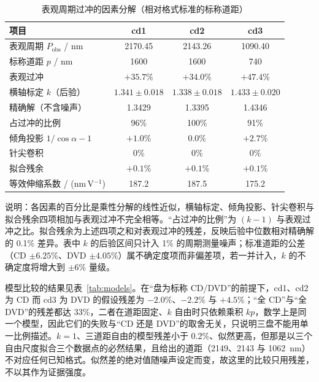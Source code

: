 \documentclass[12pt,a4paper,fontset=windows]{ctexart}
\begin{document}
\begin{table}[H]
\centering
\caption{表观周期过冲的因素分解（相对格式标准的标称道距）}
\label{tab:scale}
\footnotesize
{}
\begin{tabular}{@{}lccc@{}}
\toprule
项目 & cd1 & cd2 & cd3 \\
\midrule
表观周期 $P_{\text{obs}}$ / nm & 2170.45 & 2143.26 & 1090.40 \\
标称道距 $p$ / nm & 1600 & 1600 & 740 \\
表观过冲 & $+35.7\%$ & $+34.0\%$ & $+47.4\%$ \\
\midrule
横轴标定 $k$（后验）& $1.341\pm0.018$ & $1.338\pm0.018$ & $1.433\pm0.020$ \\
\quad 精确解（不含噪声）& 1.3429 & 1.3395 & 1.4346 \\
\quad 占过冲的比例 & 96\% & 100\% & 91\% \\
倾角投影 $1/\cos\alpha-1$ & $+1.0\%$ & $0.0\%$ & $+2.7\%$ \\
针尖卷积 & $0\%$ & $0\%$ & $0\%$ \\
拟合残余 & $+0.1\%$ & $+0.1\%$ & $+0.1\%$ \\
\midrule
等效伸缩系数 / (nm\,V$^{-1}$) & 187.2 & 187.5 & 175.2 \\
\bottomrule
\end{tabular}

\vspace{2pt}
\footnotesize 说明：各因素的百分比是乘性分解的线性近似，横轴标定、倾角投影、针尖卷积与拟合残余四项相加与表观过冲不完全相等。“占过冲的比例”为 $(k-1)$ 与表观过冲之比。拟合残余为上述四项之和对表观过冲的残差，反映后验中位数相对精确解的 0.1\% 差异。表中 $k$ 的后验区间只计入 1\% 的周期测量噪声；标准道距的公差（CD $\pm6.25\%$、DVD $\pm4.05\%$）属不确定度项而非偏差项，若一并计入，$k$ 的不确定度将增大到 $\pm6\%$ 量级。
\end{table}

模型比较的结果见表~\ref{tab:models}。在“盘为标称 CD/DVD”的前提下，cd1、cd2 为 CD 而 cd3 为 DVD 的假设残差为 $-2.0\%$、$-2.2\%$ 与 $+4.5\%$；“全 CD”与“全 DVD”的残差都达 33\%，二者在道距固定、$k$ 自由时只依赖乘积 $kp$，数学上是同一个模型，因此它们的失败与“CD 还是 DVD”的取舍无关，只说明三盘不能用单一比例描述。$k=1$、三道距自由的模型残差小于 0.2\%、似然更高，但那是以三个自由尺度拟合三个数据点的必然结果，且给出的道距（2149、2143 与 1062~nm）不对应任何已知格式。似然差的绝对值随噪声设定而变，故这里的比较只用残差，不以其作为证据强度。
\end{document}
